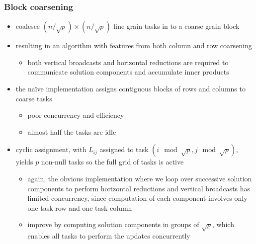 \begin{frame}[fragile]
%
  \frametitle{Block coarsening}
%
  \begin{itemize}
%
  \item coalesce $(n/\sqrt{p}) \times (n/\sqrt{p})$ fine grain tasks in to a coarse grain block
%
  \item resulting in an algorithm with features from both column and row coarsening
    \begin{itemize}
    \item both vertical broadcasts and horizontal reductions are required to communicate
      solution components and accumulate inner products
    \end{itemize}
%
  \item the na\"ive implementation assigns contiguous blocks of rows and columns to coarse
    tasks
    \begin{itemize}
    \item poor concurrency and efficiency 
    \item almost half the tasks are idle
    \end{itemize}
%
  \item cyclic assignment, with $L_{ij}$ assigned to task $(i \mod \sqrt{p}, j \mod \sqrt{p})$,
    yields $p$ non-null tasks so the full grid of tasks is active
    \begin{itemize}
    \item again, the obvious implementation where we loop over successive solution components
      to perform horizontal reductions and vertical broadcasts has limited concurrency, since
      computation of each component involves only one task row and one task column
    \item improve by computing solution components in groups of $\sqrt{p}$, which enables all
      tasks to perform the updates concurrently
    \end{itemize}
%
  \end{itemize}
%
\end{frame}



